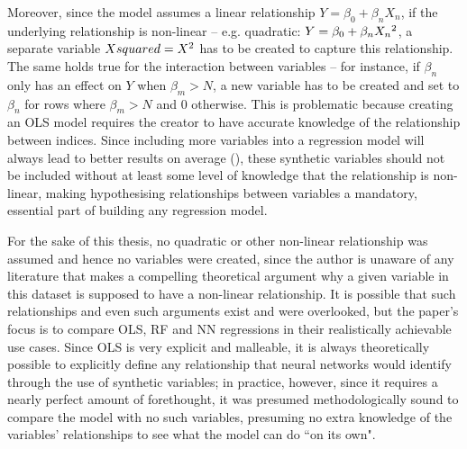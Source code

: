 \documentclass[12pt]{report}
\begin{document}
Moreover, since the model assumes a linear relationship \(Y=\beta_0+\beta_n X_n\), if the underlying relationship is non-linear -- e.g. quadratic: \(Y=\beta_0 + \beta_n X_n\textsuperscript{2}\), a separate variable \(Xsquared=X\textsuperscript{2}\) has to be created to capture this relationship. The same holds true for the interaction between variables -- for instance, if $\beta_n$ only has an effect on $Y$ when $\beta_m>N$, a new variable has to be created and set to $\beta_n$ for rows where $\beta_m>N$ and 0 otherwise. This is problematic because creating an OLS model requires the creator to have accurate knowledge of the relationship between indices. Since including more variables into a regression model will always lead to better results on average (\cite{Aoki2023}), these synthetic variables should not be included without at least some level of knowledge that the relationship is non-linear, making hypothesising relationships between variables a mandatory, essential part of building any regression model.

For the sake of this thesis, no quadratic or other non-linear relationship was assumed and hence no variables were created, since the author is unaware of any literature that makes a compelling theoretical argument why a given variable in this dataset is supposed to have a non-linear relationship. It is possible that such relationships and even such arguments exist and were overlooked, but the paper's focus is to compare OLS, RF and NN regressions in their realistically achievable use cases. Since OLS is very explicit and malleable, it is always theoretically possible to explicitly define any relationship that neural networks would identify through the use of synthetic variables; in practice, however, since it requires a nearly perfect amount of forethought, it was presumed methodologically sound to compare the model with no such variables, presuming no extra knowledge of the variables' relationships to see what the model can do ``on its own".
\end{document}
